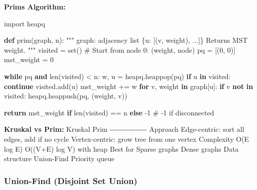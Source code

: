 \documentclass[11pt]{article}
\newenvironment{Shaded}{\begin{snugshade}}{\end{snugshade}}
\newcommand{\BuiltInTok}[1]{\textcolor[rgb]{0.50,0.55,0.55}{#1}}
\newcommand{\CommentTok}[1]{\textcolor[rgb]{0.48,0.49,0.49}{#1}}
\newcommand{\ControlFlowTok}[1]{\textcolor[rgb]{0.99,0.74,0.29}{\textbf{#1}}}
\newcommand{\DecValTok}[1]{\textcolor[rgb]{0.96,0.45,0.00}{#1}}
\newcommand{\ImportTok}[1]{\textcolor[rgb]{0.15,0.68,0.38}{#1}}
\newcommand{\KeywordTok}[1]{\textcolor[rgb]{0.81,0.81,0.76}{\textbf{#1}}}
\newcommand{\NormalTok}[1]{\textcolor[rgb]{0.81,0.81,0.76}{#1}}
\newcommand{\OperatorTok}[1]{\textcolor[rgb]{0.81,0.81,0.76}{#1}}
\begin{document}
\textbf{Prim\textquotesingle s Algorithm:}


\begin{Shaded}
\begin{Highlighting}[]
\ImportTok{import}\NormalTok{ heapq}

\KeywordTok{def}\NormalTok{ prim(graph, n):}
    \CommentTok{"""}
\CommentTok{    graph: adjacency list \{u: [(v, weight), ...]\}}
\CommentTok{    Returns MST weight.}
\CommentTok{    """}
\NormalTok{    visited }\OperatorTok{=} \BuiltInTok{set}\NormalTok{()}
    \CommentTok{\# Start from node 0: (weight, node)}
\NormalTok{    pq }\OperatorTok{=}\NormalTok{ [(}\DecValTok{0}\NormalTok{, }\DecValTok{0}\NormalTok{)]}
\NormalTok{    mst\_weight }\OperatorTok{=} \DecValTok{0}

    \ControlFlowTok{while}\NormalTok{ pq }\KeywordTok{and} \BuiltInTok{len}\NormalTok{(visited) }\OperatorTok{\textless{}}\NormalTok{ n:}
\NormalTok{        w, u }\OperatorTok{=}\NormalTok{ heapq.heappop(pq)}
        \ControlFlowTok{if}\NormalTok{ u }\KeywordTok{in}\NormalTok{ visited:}
            \ControlFlowTok{continue}
\NormalTok{        visited.add(u)}
\NormalTok{        mst\_weight }\OperatorTok{+=}\NormalTok{ w}
        \ControlFlowTok{for}\NormalTok{ v, weight }\KeywordTok{in}\NormalTok{ graph[u]:}
            \ControlFlowTok{if}\NormalTok{ v }\KeywordTok{not} \KeywordTok{in}\NormalTok{ visited:}
\NormalTok{                heapq.heappush(pq, (weight, v))}

    \ControlFlowTok{return}\NormalTok{ mst\_weight }\ControlFlowTok{if} \BuiltInTok{len}\NormalTok{(visited) }\OperatorTok{==}\NormalTok{ n }\ControlFlowTok{else} \OperatorTok{{-}}\DecValTok{1}  \CommentTok{\# {-}1 if disconnected}
\end{Highlighting}
\end{Shaded}

\textbf{Kruskal vs Prim:}
\textbar{} \textbar{} Kruskal \textbar{} Prim \textbar{}
\textbar-\textbar-\/-\/-\/-\/-\/-\/-\/-\/-\textbar-\/-\/-\/-\/-\/-\textbar{}
\textbar{} Approach \textbar{} Edge-centric: sort all edges, add if no cycle \textbar{} Vertex-centric: grow tree from one vertex \textbar{}
\textbar{} Complexity \textbar{} O(E log E) \textbar{} O((V+E) log V) with heap \textbar{}
\textbar{} Best for \textbar{} Sparse graphs \textbar{} Dense graphs \textbar{}
\textbar{} Data structure \textbar{} Union-Find \textbar{} Priority queue \textbar{}

\subsubsection{Union-Find (Disjoint Set Union)}\label{union-find-disjoint-set-union}
\end{document}
